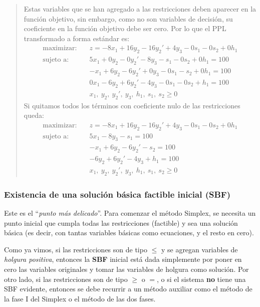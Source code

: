 \begin{quote}
  Estas variables que se han agregado a las restricciones deben aparecer en la función objetivo, sin embargo, como no son variables de decisión, su coeficiente en la función objetivo debe ser cero. Por lo que el PPL transformado a forma estándar es:
  \begin{align*}
    \text{maximizar:} \quad   &z = -8x_1 + 16y_2 - 16y_2' + 4y_3 - 0s_1 - 0s_2 + 0h_1 \\[3pt]
    \text{sujeto a:} \quad    &5x_1 + 0y_2 - 0y_2' - 8y_3 - s_1 - 0s_2 + 0h_1 = 100 \\
                              &-x_1 + 6y_2 - 6y_2' + 0y_3 - 0s_1 - s_2 + 0h_1 = 100 \\
                              &0x_1 -6y_2 + 6y_2' - 4y_3 - 0s_1 - 0s_2 + h_1 = 100 \\
                              &x_1,\ y_2,\ y_2',\ y_3,\ h_1,\ s_1,\ s_2 \geq 0
  \end{align*}
  Si quitamos todos los términos con coeficiente nulo de las restricciones queda:
  \begin{align*}
    \text{maximizar:} \quad   &z = -8x_1 + 16y_2 - 16y_2' + 4y_3 - 0s_1 - 0s_2 + 0h_1 \\[3pt]
    \text{sujeto a:} \quad    &5x_1 - 8y_3 - s_1 = 100 \\
                              &-x_1 + 6y_2 - 6y_2' - s_2 = 100 \\
                              &-6y_2 + 6y_2' - 4y_3 + h_1 = 100 \\
                              &x_1,\ y_2,\ y_2',\ y_3,\ h_1,\ s_1,\ s_2 \geq 0
  \end{align*}
\end{quote}

\subsubsection{Existencia de una solución básica factible inicial (SBF)}

Este es el ``\textit{punto más delicado}''. Para comenzar el método Simplex, se necesita un punto inicial que cumpla todas las restricciones (factible) y sea una solución básica (es decir, con tantas variables básicas como ecuaciones, y el resto en cero).

Como ya vimos, si las restricciones son de tipo \(\leq\) y se agregan variables de \textit{holgura positiva}, entonces la \textbf{SBF} inicial está dada simplemente por poner en cero las variables originales y tomar las variables de holgura como solución. Por otro lado, si las restricciones son de tipo \(\geq\) o \(=\), o si el sistema \textbf{no} tiene una SBF evidente, entonces se debe recurrir a un método auxiliar como el método de la fase I del Simplex o el método de las dos fases.

